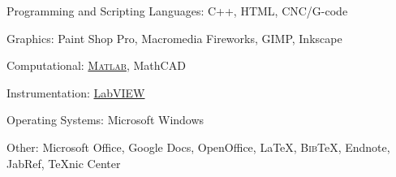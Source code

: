 \documentclass[10pt]{article}
\newcommand{\blankline}{\quad\pagebreak[2]}
\begin{document}
\blankline

Programming and Scripting Languages: C++, HTML, CNC/G-code

\blankline


Graphics: Paint Shop Pro, Macromedia Fireworks, GIMP, Inkscape

\blankline


Computational: \href{http://www.mathworks.com/products/matlab/}{\textsc{Matlab}}, MathCAD

\blankline

Instrumentation: \href{http://www.ni.com/}{LabVIEW}

\blankline

Operating Systems: Microsoft Windows

\blankline

Other: Microsoft Office, Google Docs, OpenOffice, \LaTeX{}, B\textsc{ib}\TeX{}, Endnote, JabRef, TeXnic Center
\end{document}
